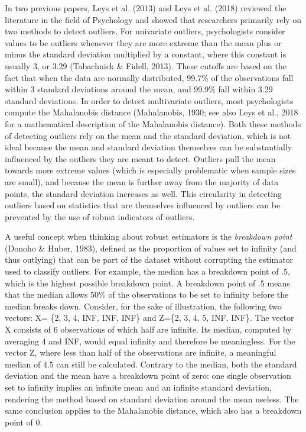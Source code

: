 \documentclass[man,floatsintext]{apa6}
\begin{document}
In two previous papers, Leys et al. (2013) and Leys et al. (2018) reviewed the literature in the field of Psychology and showed that researchers primarily rely on two methods to detect outliers. For univariate outliers, psychologists consider values to be outliers whenever they are more extreme than the mean plus or minus the standard deviation multiplied by a constant, where this constant is usually 3, or 3.29 (Tabachnick \& Fidell, 2013). These cutoffs are based on the fact that when the data are normally distributed, 99.7\% of the observations fall within 3 standard deviations around the mean, and 99.9\% fall within 3.29 standard deviations. In order to detect multivariate outliers, most psychologists compute the Mahalanobis distance (Mahalanobis, 1930; see also Leys et al., 2018 for a mathematical description of the Mahalanobis distance). Both these methods of detecting outliers rely on the mean and the standard deviation, which is not ideal because the mean and standard deviation themselves can be substantially influenced by the outliers they are meant to detect. Outliers pull the mean towards more extreme values (which is especially problematic when sample sizes are small), and because the mean is further away from the majority of data points, the standard deviation increases as well. This circularity in detecting outliers based on statistics that are themselves influenced by outliers can be prevented by the use of robust indicators of outliers.

A useful concept when thinking about robust estimators is the \emph{breakdown point} (Donoho \& Huber, 1983), defined as the proportion of values set to infinity (and thus outlying) that can be part of the dataset without corrupting the estimator used to classify outliers. For example, the median has a breakdown point of .5, which is the highest possible breakdown point. A breakdown point of .5 means that the median allows 50\% of the observations to be set to infinity before the median breaks down. Consider, for the sake of illustration, the following two vectors: X= \{2, 3, 4, INF, INF, INF\} and Z=\{2, 3, 4, 5, INF, INF\}. The vector X consists of 6 observations of which half are infinite. Its median, computed by averaging 4 and INF, would equal infinity and therefore be meaningless. For the vector Z, where less than half of the observations are infinite, a meaningful median of 4.5 can still be calculated. Contrary to the median, both the standard deviation and the mean have a breakdown point of zero: one single observation set to infinity implies an infinite mean and an infinite standard deviation, rendering the method based on standard deviation around the mean useless. The same conclusion applies to the Mahalanobis distance, which also has a breakdown point of 0.
\end{document}

